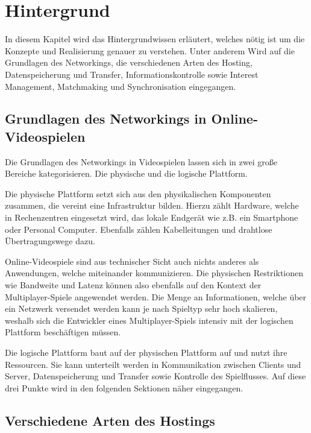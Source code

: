 
\chapter{Hintergrund}
\label{sec:hintergrund}

In diesem Kapitel wird das Hintergrundwissen erläutert, welches nötig ist um die Konzepte und Realisierung genauer zu verstehen. Unter anderem Wird auf die Grundlagen des Networkings, die verschiedenen Arten des Hosting, Datenspeicherung und Transfer, Informationskontrolle sowie Interest Management, Matchmaking und Synchronisation eingegangen.

\section{Grundlagen des Networkings in Online-Videospielen}

Die Grundlagen des Networkings in Videospielen lassen sich in zwei große Bereiche kategorisieren. Die physische und die logische Plattform. 

Die physische Plattform setzt sich aus den physikalischen Komponenten zusammen, die vereint eine Infrastruktur bilden. Hierzu zählt Hardware, welche in Rechenzentren eingesetzt wird, das lokale Endgerät wie z.B. ein Smartphone oder Personal Computer. Ebenfalls zählen Kabelleitungen und drahtlose Übertragungswege dazu. 

Online-Videospiele sind aus technischer Sicht auch nichts anderes als Anwendungen, welche miteinander kommunizieren. Die physischen Restriktionen wie Bandweite und Latenz können also ebenfalls auf den Kontext der Multiplayer-Spiele angewendet werden. Die Menge an Informationen, welche über ein Netzwerk versendet werden kann je nach Spieltyp sehr hoch skalieren, weshalb sich die Entwickler eines Multiplayer-Spiels intensiv mit der logischen Plattform beschäftigen müssen.

Die logische Plattform baut auf der physischen Plattform auf und nutzt ihre Ressourcen. Sie kann unterteilt werden in Kommunikation zwischen Clients und Server, Datenspeicherung und Transfer sowie Kontrolle des Spielflusses. Auf diese drei Punkte wird in den folgenden Sektionen näher eingegangen.

\cite{Smed.2002c}


\section{Verschiedene Arten des Hostings}

